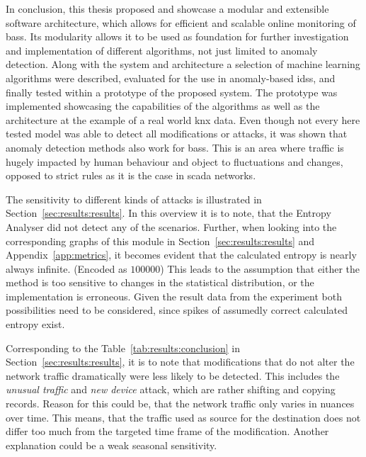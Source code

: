 In conclusion, this thesis proposed and showcase a modular and extensible software architecture, which allows for efficient and scalable online monitoring of \glspl{bas}.
Its modularity allows it to be used as foundation for further investigation and implementation of different algorithms, not just limited to anomaly detection.
Along with the system and architecture a selection of machine learning algorithms were described, evaluated for the use in anomaly-based \glspl{ids}, and finally tested within a prototype of the proposed system.
The prototype was implemented showcasing the capabilities of the algorithms as well as the architecture at the example of a real world \gls{knx} data.
Even though not every here tested model was able to detect all modifications or attacks, it was shown that anomaly detection methods also work for \glspl{bas}. This is an area where traffic is hugely impacted by human behaviour and object to fluctuations and changes, opposed to strict rules as it is the case in \gls{scada} networks.

The sensitivity to different kinds of attacks is illustrated in Section~\ref{sec:results:results}.
In this overview it is to note, that the Entropy Analyser did not detect any of the scenarios. Further, when looking into the corresponding graphs of this module in Section~\ref{sec:results:results} and Appendix~\ref{app:metrics}, it becomes evident that the calculated entropy is nearly always infinite. (Encoded as \(100 000\)) 
This leads to the assumption that either the method is too sensitive to changes in the statistical distribution, or the implementation is erroneous. Given the result data from the experiment both possibilities need to be considered, since spikes of assumedly correct calculated entropy exist.

Corresponding to the Table~\ref{tab:results:conclusion} in Section~\ref{sec:results:results}, it is to note that modifications that do not alter the network traffic dramatically were less likely to be detected. This includes the \emph{unusual traffic} and \emph{new device} attack, which are rather shifting and copying records.
Reason for this could be, that the network traffic only varies in nuances over time.
This means, that the traffic used as source for the destination does not differ too much from the targeted time frame of the modification.
Another explanation could be a weak seasonal sensitivity.

